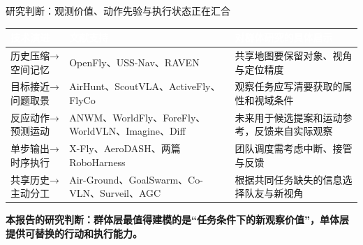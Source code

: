 \documentclass[aspectratio=169,10pt]{beamer}
\newcommand{\takeaway}[1]{\par\begin{takebox}\fontsize{9.1}{11.5}\selectfont\bfseries\color{navy}#1\end{takebox}}
\newcommand{\thd}[1]{\textcolor{white}{\bfseries #1}}
\begin{document}
\begin{frame}[t,label=synthesis]{研究判断：观测价值、动作先验与执行状态正在汇合}
\relax
{\fontsize{8.5}{10.8}\selectfont{}
\begin{tabularx}{\linewidth}{@{}Y{0.75}Y{1.1}Y{1.15}@{}}\toprule{}\thd{技术演进} & \thd{文献支持} & \thd{对群体研究的具体启示}\\\midrule
历史压缩→空间记忆 & OpenFly、USS-Nav、RAVEN & 共享地图要保留对象、视角与定位精度\\
目标接近→问题取景 & AirHunt、ScoutVLA、ActiveFly、FlyCo & 观察任务应写清要获取的属性和视域条件\\
反应动作→预测运动 & ANWM、WorldFly、ForeFly、WorldVLN、Imagine、Diff & 未来用于候选提案和运动参考，反馈来自实际观察\\
单步输出→时序执行 & X-Fly、AeroDASH、两篇RoboHarness & 团队调度需考虑中断、接管与反馈\\
共享历史→主动分工 & Air-Ground、GoalSwarm、Co-VLN、Surveil、AGC & 根据共同任务缺失的信息选择队友与新视角\\
\bottomrule\end{tabularx}\par}
\takeaway{本报告的研究判断：群体层最值得建模的是“任务条件下的新观察价值”，单体层提供可替换的行动和执行能力。}
\end{frame}
\end{document}

